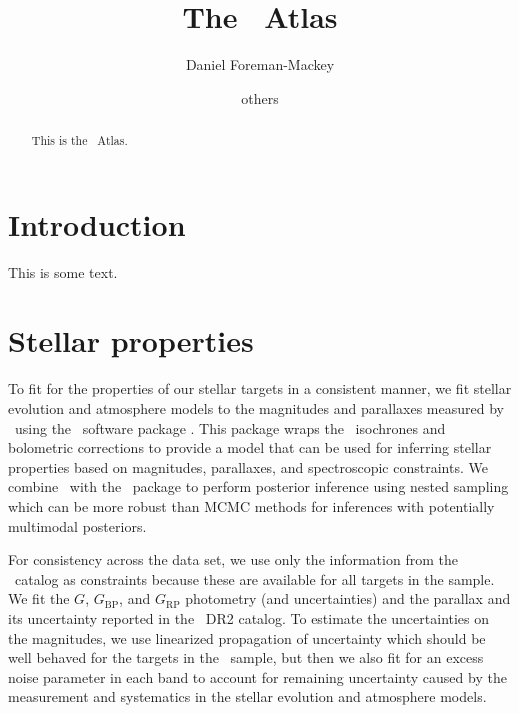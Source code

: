 \documentclass[modern]{aastex63}
\begin{document}
\title{The \tess\ Atlas}


\author[0000-0002-9328-5652]{Daniel Foreman-Mackey}

\author{others}

\begin{abstract}

This is the \tess\ Atlas.

\end{abstract}


\section{Introduction} \label{sec:intro}

This is some text.

\section{Stellar properties}

To fit for the properties of our stellar targets in a consistent manner, we fit stellar evolution and atmosphere models to the magnitudes and parallaxes measured by \gaia\ using the \isochrones\ software package \citep{Morton:2015}.
This package wraps the \mist\ isochrones and bolometric corrections to provide a model that can be used for inferring stellar properties based on magnitudes, parallaxes, and spectroscopic constraints.
We combine \isochrones\ with the \dynesty\ package to perform posterior inference using nested sampling which can be more robust than MCMC methods for inferences with potentially multimodal posteriors.

For consistency across the data set, we use only the information from the \gaia\ catalog as constraints because these are available for all targets in the sample.
We fit the $G$, $G_\mathrm{BP}$, and $G_\mathrm{RP}$ photometry (and uncertainties) and the parallax and its uncertainty reported in the \gaia\ DR2 catalog.
To estimate the uncertainties on the magnitudes, we use linearized propagation of uncertainty which should be well behaved for the targets in the \tess\ sample, but then we also fit for an excess noise parameter in each band to account for remaining uncertainty caused by the measurement and systematics in the stellar evolution and atmosphere models.
\end{document}
